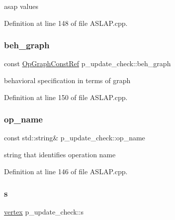 asap values 



Definition at line 148 of file A\+S\+L\+A\+P.\+cpp.

\mbox{\label{structp__update__check_a43601397114040ac12090019f8ea9764}} 
\subsubsection{\texorpdfstring{beh\+\_\+graph}{beh\_graph}}
{\footnotesize\ttfamily const \hyperlink{op__graph_8hpp_a9a0b240622c47584bee6951a6f5de746}{Op\+Graph\+Const\+Ref} p\+\_\+update\+\_\+check\+::beh\+\_\+graph\hspace{0.3cm}{\ttfamily [private]}}



behavioral specification in terms of graph 



Definition at line 150 of file A\+S\+L\+A\+P.\+cpp.

\mbox{\label{structp__update__check_a06300c3b747d6747ad4809702bb7d73b}} 
\subsubsection{\texorpdfstring{op\+\_\+name}{op\_name}}
{\footnotesize\ttfamily const std\+::string\& p\+\_\+update\+\_\+check\+::op\+\_\+name\hspace{0.3cm}{\ttfamily [private]}}



string that identifies operation name 



Definition at line 146 of file A\+S\+L\+A\+P.\+cpp.

\mbox{\label{structp__update__check_a437540c1bdd220c67af9c9ed0ce9694a}} 
\subsubsection{\texorpdfstring{s}{s}}
{\footnotesize\ttfamily \hyperlink{graph_8hpp_abefdcf0544e601805af44eca032cca14}{vertex} p\+\_\+update\+\_\+check\+::s\hspace{0.3cm}{\ttfamily [private]}}



